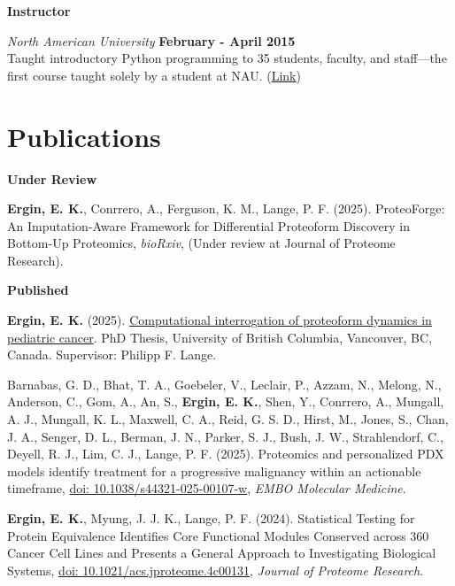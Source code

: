 \documentclass[margin,line]{res}
\begin{document}
\begin{resume}
{\bf Instructor}
\vspace{-.1cm}

{\em North American University} \hfill {\bf February - April 2015}\\
Taught introductory Python programming to 35 students, faculty, and staff---the first course taught solely by a student at NAU. (\href{https://github.com/NAU-Python-Class/Py101-Spring-15}{Link})


\section{\sc Publications}
{\bf Under Review}

\vspace*{-.3cm}
{\bf Ergin, E. K.}, Conrrero, A., Ferguson, K. M., Lange, P. F. (2025). ProteoForge: An Imputation-Aware Framework for Differential Proteoform Discovery in Bottom-Up Proteomics, {\em bioRxiv}, (Under review at Journal of Proteome Research).


{\bf Published}


{\bf Ergin, E. K.} (2025). \href{https://open.library.ubc.ca/cIRcle/collections/ubctheses/24/items/1.0448334}{Computational interrogation of proteoform dynamics in pediatric cancer}. PhD Thesis, University of British Columbia, Vancouver, BC, Canada. Supervisor: Philipp F. Lange.

Barnabas, G. D., Bhat, T. A., Goebeler, V., Leclair, P., Azzam, N., Melong, N., Anderson, C., Gom, A., An, S., {\bf Ergin, E. K.}, Shen, Y., Conrrero, A., Mungall, A. J., Mungall, K. L., Maxwell, C. A., Reid, G. S. D., Hirst, M., Jones, S., Chan, J. A., Senger, D. L., Berman, J. N., Parker, S. J., Bush, J. W., Strahlendorf, C., Deyell, R. J., Lim, C. J., Lange, P. F. (2025). Proteomics and personalized PDX models identify treatment for a progressive malignancy within an actionable timeframe, \href{https://pmc.ncbi.nlm.nih.gov/articles/PMC11982353/}{doi: 10.1038/s44321-025-00107-w}, {\em EMBO Molecular Medicine}.

{\bf Ergin, E. K.}, Myung, J. J. K., Lange, P. F. (2024). Statistical Testing for Protein Equivalence Identifies Core Functional Modules Conserved across 360 Cancer Cell Lines and Presents a General Approach to Investigating Biological Systems, \href{https://doi.org/10.1021/acs.jproteome.4c00131}{doi: 10.1021/acs.jproteome.4c00131}, {\em Journal of Proteome Research}.


\end{resume}
\end{document}
